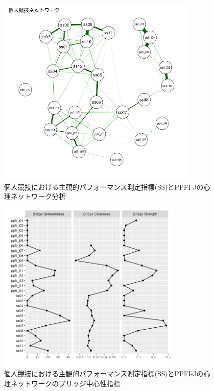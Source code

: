 \documentclass[12pt,a4paper,xelatex,ja=standard]{bxjsarticle}
\begin{document}
\begin{figure}[H]
\centering
\includegraphics[clip,width = 10cm]{individual network.png}
\caption{個人競技における主観的パフォーマンス測定指標(SS)とPPFI-Jの心理ネットワーク分析}
\end{figure}

\begin{figure}[H]
\centering
\includegraphics[clip,width = 9cm]{individual_bridge.png}
\caption{個人競技における主観的パフォーマンス測定指標(SS)とPPFI-Jの心理ネットワークのブリッジ中心性指標}
\end{figure}
\end{document}
